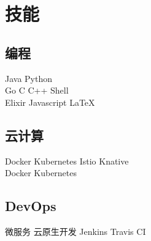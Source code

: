 \documentclass[]{deedy-resume-openfont}
\begin{document}
\begin{minipage}[t]{0.3\textwidth}


\section{技能}
\sectionsep
\subsection{编程}
Java \textbullet{} Python  \\
Go \textbullet{} C \textbullet{} C++ \textbullet{} Shell \\
Elixir \textbullet{} Javascript \textbullet{} \LaTeX\ \\ 
\sectionsep

\subsection{云计算}
Docker \textbullet{} Kubernetes \textbullet{} Istio \textbullet{} Knative \\
Docker \textbullet{} Kubernetes  \\
\sectionsep

\subsection{DevOps}
微服务 \textbullet{} 云原生开发 \textbullet{} Jenkins \textbullet{} Travis CI

%
%

\end{minipage} 
\hfill
\end{document}

